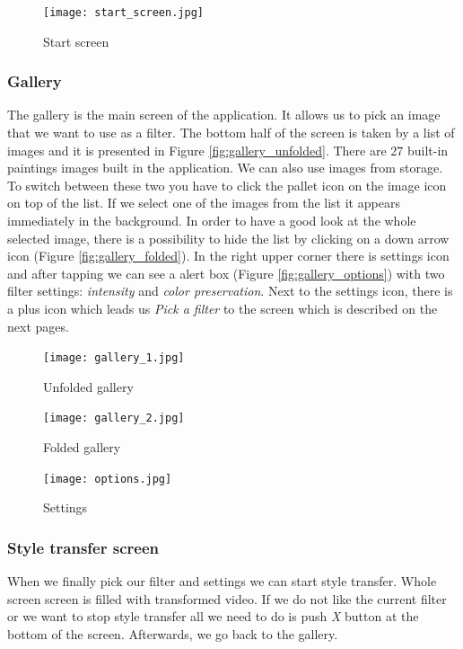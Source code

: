 \documentclass[../Main.tex]{subfiles}
\begin{document}
\begin{figure}[H]
    \centering
    \texttt{[image: start\_screen.jpg]}
    \caption{Start screen}
    \label{fig:start-screen}
\end{figure}


\subsubsection{Gallery}
The gallery is the main screen of the application. It allows us to pick an image 
that we want to use as a filter. The bottom half of the screen is taken by a list of images and it is presented in Figure \ref{fig:gallery_unfolded}.
There are 27 built-in paintings images built in the application. We can also use images from storage.
To switch between these two you have to click the pallet icon on the image icon on top of the list.
If we select one of the images from the list it appears immediately in the background.
In order to have a good look at the whole selected image, there is a possibility 
to hide the list by clicking on a down arrow icon (Figure \ref{fig:gallery_folded}).
In the right upper corner there is settings icon and after tapping we can see a 
alert box (Figure \ref{fig:gallery_options}) with two filter settings:
\textit{intensity} and \textit{color preservation}.
Next to the settings icon, there is a plus icon which leads us \textit{Pick a filter} 
to the screen which is described on the next pages.


\begin{figure}[H]
        \texttt{[image: gallery\_1.jpg]}
        \caption{Unfolded gallery}\label{fig:gallery_unfolded}
    \endminipage\hfill
        \texttt{[image: gallery\_2.jpg]}
        \caption{Folded gallery}\label{fig:gallery_folded}
    \endminipage\hfill
        \texttt{[image: options.jpg]}
        \caption{Settings}\label{fig:gallery_options2}
    \endminipage\hfill
\end{figure}

\newpage
\subsubsection{Style transfer screen}
When we finally pick our filter and settings we can start style transfer.
Whole screen screen is filled with transformed video.
If we do not like the current filter or we want to stop style transfer all we need to 
do is push \textit{X} button at the bottom of the screen.
Afterwards, we go back to the gallery. 
\end{document}
